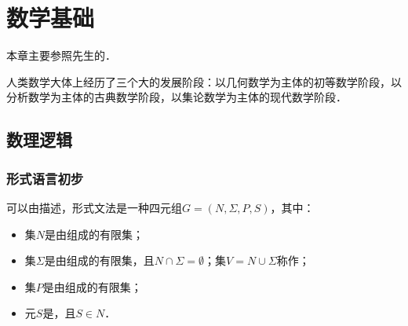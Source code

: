 \chapter{数学基础}

本章主要参照\citeauthor{WangFt2001}先生的\cite{WangFt2001}．

人类数学大体上经历了三个大的发展阶段：以几何数学为主体的初等数学阶段，以分析数学为主体的古典数学阶段，以集论数学为主体的现代数学阶段．

\section{数理逻辑}

\subsection{形式语言初步}

可以由描述，形式文法是一种四元组$G=(N,\Sigma,P,S)$，其中：
\begin{itemize}
    \item 集$N$是由组成的有限集；
    \item 集$\Sigma$是由组成的有限集，且$N\cap\Sigma=\emptyset$；集$V=N\cup\Sigma$称作；
    \item 集$P$是由组成的有限集；
    \item 元$S$是，且$S\in{}N$．
\end{itemize}

